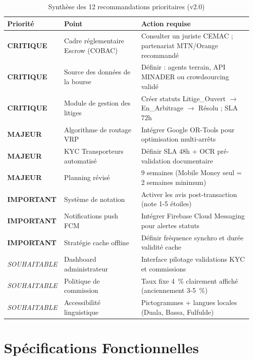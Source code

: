 \documentclass[12pt,a4paper]{report}
\begin{document}
\begin{table}[H]
\centering
\caption{Synthèse des 12 recommandations prioritaires (v2.0)}
\begin{tabularx}{\textwidth}{C{2.2cm} L{4.5cm} X}
\toprule
\textbf{Priorité} & \textbf{Point} & \textbf{Action requise} \\
\midrule
\textcolor{critred}{\textbf{CRITIQUE}} & Cadre réglementaire Escrow (COBAC) & Consulter un juriste CEMAC ; partenariat MTN/Orange recommandé \\
\textcolor{critred}{\textbf{CRITIQUE}} & Source des données de la bourse & Définir : agents terrain, API MINADER ou crowdsourcing validé \\
\textcolor{critred}{\textbf{CRITIQUE}} & Module de gestion des litiges & Créer statuts Litige\_Ouvert $\to$ En\_Arbitrage $\to$ Résolu ; SLA 72h \\
\textcolor{warnorange}{\textbf{MAJEUR}} & Algorithme de routage VRP & Intégrer Google OR-Tools pour optimisation multi-arrêts \\
\textcolor{warnorange}{\textbf{MAJEUR}} & KYC Transporteurs automatisé & Définir SLA 48h + OCR pré-validation documentaire \\
\textcolor{warnorange}{\textbf{MAJEUR}} & Planning révisé & 9 semaines (Mobile Money seul = 2 semaines minimum) \\
\textbf{IMPORTANT} & Système de notation & Activer les avis post-transaction (note 1-5 étoiles) \\
\textbf{IMPORTANT} & Notifications push FCM & Intégrer Firebase Cloud Messaging pour alertes statuts \\
\textbf{IMPORTANT} & Stratégie cache offline & Définir fréquence synchro et durée validité cache \\
\textit{SOUHAITABLE} & Dashboard administrateur & Interface pilotage validations KYC et commissions \\
\textit{SOUHAITABLE} & Politique de commission & Taux fixe 4~\% clairement affiché (anciennement 3-5~\%) \\
\textit{SOUHAITABLE} & Accessibilité linguistique & Pictogrammes + langues locales (Duala, Bassa, Fulfulde) \\
\bottomrule
\end{tabularx}
\end{table}

\chapter{Spécifications Fonctionnelles}
\end{document}

